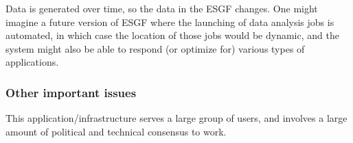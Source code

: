 
Data is generated over time, so the data in the ESGF changes.  One might imagine a future
version of ESGF where the launching of data analysis jobs is automated, in which case  the
location of those jobs would be dynamic, and the system might also be able to respond
(or optimize for) various types of applications.

 \subsubsection*{Other important issues}



This application/infrastructure serves a large group of users, and involves a large amount of political and technical consensus to work.


